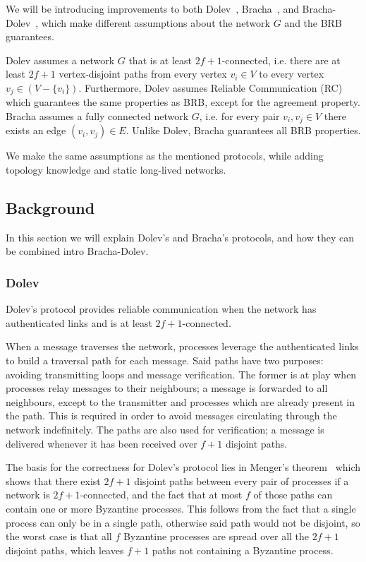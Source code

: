 We will be introducing improvements to both Dolev~\cite{dolev}, Bracha~\cite{bracha}, and Bracha-Dolev~\cite{bracha-dolev}, which make different assumptions about the network $G$ and the BRB guarantees. 


Dolev assumes a network $G$ that is at least $2f+1$-connected, i.e. there are at least $2f+1$ vertex-disjoint paths from every vertex $v_i \in V$ to every vertex $v_j \in (V - \{v_i\})$. Furthermore, Dolev assumes Reliable Communication (RC) which guarantees the same properties as BRB, except for the agreement property. Bracha assumes a fully connected network $G$, i.e. for every pair $v_i,v_j \in V$ there exists an edge $(v_i, v_j) \in E$. Unlike Dolev, Bracha guarantees all BRB properties.

We make the same assumptions as the mentioned protocols, while adding topology knowledge and static long-lived networks.

\subsection*{Background}
In this section we will explain Dolev's and Bracha's protocols, and how they can be combined intro Bracha-Dolev.

\subsubsection{Dolev}
Dolev's protocol provides reliable communication when the network has authenticated links and is at least $2f+1$-connected.

When a message traverses the network, processes leverage the authenticated links to build a traversal path for each message. Said paths have two purposes: avoiding transmitting loops and message verification. 
The former is at play when processes relay messages to their neighbours; a message is forwarded to all neighbours, except to the transmitter and processes which are already present in the path. This is required in order to avoid messages circulating through the network indefinitely.
The paths are also used for verification; a message is delivered whenever it has been received over $f+1$ disjoint paths.

The basis for the correctness for Dolev's protocol lies in Menger's theorem~\cite{menger} which shows that there exist $2f+1$ disjoint paths between every pair of processes if a network is $2f+1$-connected, and the fact that at most $f$ of those paths can contain one or more Byzantine processes. This follows from the fact that a single process can only be in a single path, otherwise said path would not be disjoint, so the worst case is that all $f$ Byzantine processes are spread over all the $2f+1$ disjoint paths, which leaves $f+1$ paths not containing a Byzantine process.

